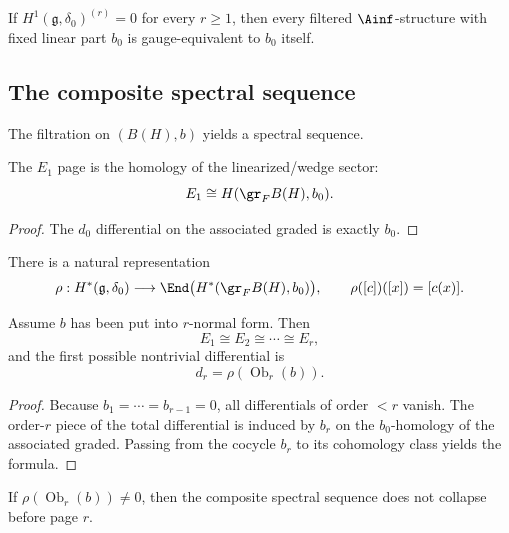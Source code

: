 \begin{corollary}
\label{cor:cbt-relative-formality}
\ClaimStatusProvedHere
If $H^1(\mathfrak g,\delta_0)^{(r)}=0$ for every $r\ge1$, then every filtered $\Ainf$-structure with fixed linear part $b_0$ is gauge-equivalent to $b_0$ itself.
\end{corollary}

\subsection{The composite spectral sequence}
\label{sec:cbt-composite-spectral}

The filtration on $(B(H),b)$ yields a spectral sequence.

\begin{proposition}
\label{prop:cbt-E1-page}
\ClaimStatusProvedHere
The $E_1$ page is the homology of the linearized/wedge sector:
\[
E_1\cong H(\gr_FB(H),b_0).
\]
\end{proposition}

\begin{proof}
The $d_0$ differential on the associated graded is exactly $b_0$.
\end{proof}

There is a natural representation
\[
\rho:H^\ast(\mathfrak g,\delta_0)\longrightarrow
\End\big(H^\ast(\gr_FB(H),b_0)\big),
\qquad
\rho([c])([x])=[c(x)].
\]

\begin{theorem}
\label{thm:cbt-spectral-obstruction}
\ClaimStatusProvedHere
Assume $b$ has been put into $r$-normal form. Then
\[
E_1\cong E_2\cong\cdots\cong E_r,
\]
and the first possible nontrivial differential is
\[
d_r=\rho(\operatorname{Ob}_r(b)).
\]
\end{theorem}

\begin{proof}
Because $b_1=\cdots=b_{r-1}=0$, all differentials of order $<r$ vanish. The order-$r$ piece of the total differential is induced by $b_r$ on the $b_0$-homology of the associated graded. Passing from the cocycle $b_r$ to its cohomology class yields the formula.
\end{proof}

\begin{corollary}
\label{cor:cbt-spectral-noncollapse}
\ClaimStatusProvedHere
If $\rho(\operatorname{Ob}_r(b))\neq0$, then the composite spectral sequence does not collapse before page $r$.
\end{corollary}

